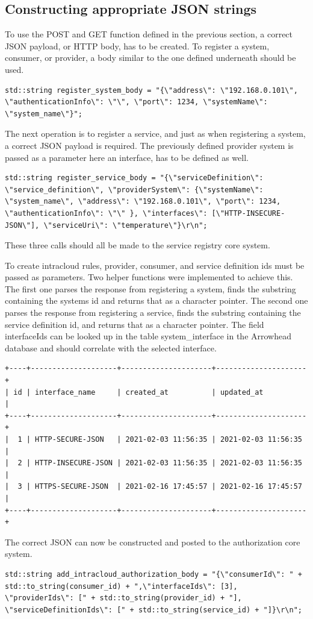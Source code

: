 \subsection{Constructing appropriate JSON strings}
To use the POST and GET function defined in the previous section, a correct JSON payload, or HTTP body, has to be created.
To register a system, consumer, or provider, a body similar to the one defined underneath should be used.
\begin{lstlisting}[style=CStyle]
    std::string register_system_body = "{\"address\": \"192.168.0.101\", \"authenticationInfo\": \"\", \"port\": 1234, \"systemName\": \"system_name\"}";
\end{lstlisting}

The next operation is to register a service, and just as when registering a system, a correct JSON payload is required.
The previously defined provider system is passed as a parameter here an interface, has to be defined as well.
\begin{lstlisting}[style=CStyle]
    std::string register_service_body = "{\"serviceDefinition\": \"service_definition\", \"providerSystem\": {\"systemName\": \"system_name\", \"address\": \"192.168.0.101\", \"port\": 1234, \"authenticationInfo\": \"\" }, \"interfaces\": [\"HTTP-INSECURE-JSON\"], \"serviceUri\": \"temperature\"}\r\n";
\end{lstlisting}
These three calls should all be made to the service registry core system.

To create intracloud rules, provider, consumer, and service definition ids must be passed as parameters.
Two helper functions were implemented to achieve this.
The first one parses the response from registering a system, finds the substring containing the systems id and returns that as a character pointer.
The second one parses the response from registering a service, finds the substring containing the service definition id, and returns that as a character pointer.
The field interfaceIds can be looked up in the table system\_interface in the Arrowhead database and should correlate with the selected interface.
\begin{lstlisting}[style=SQLstyle]
+----+--------------------+---------------------+---------------------+
| id | interface_name     | created_at          | updated_at          |
+----+--------------------+---------------------+---------------------+
|  1 | HTTP-SECURE-JSON   | 2021-02-03 11:56:35 | 2021-02-03 11:56:35 |
|  2 | HTTP-INSECURE-JSON | 2021-02-03 11:56:35 | 2021-02-03 11:56:35 |
|  3 | HTTPS-SECURE-JSON  | 2021-02-16 17:45:57 | 2021-02-16 17:45:57 |
+----+--------------------+---------------------+---------------------+
\end{lstlisting}
The correct JSON can now be constructed and posted to the authorization core system.
\begin{lstlisting}[style=CStyle]
    std::string add_intracloud_authorization_body = "{\"consumerId\": " + std::to_string(consumer_id) + ",\"interfaceIds\": [3], \"providerIds\": [" + std::to_string(provider_id) + "], \"serviceDefinitionIds\": [" + std::to_string(service_id) + "]}\r\n";
\end{lstlisting}

